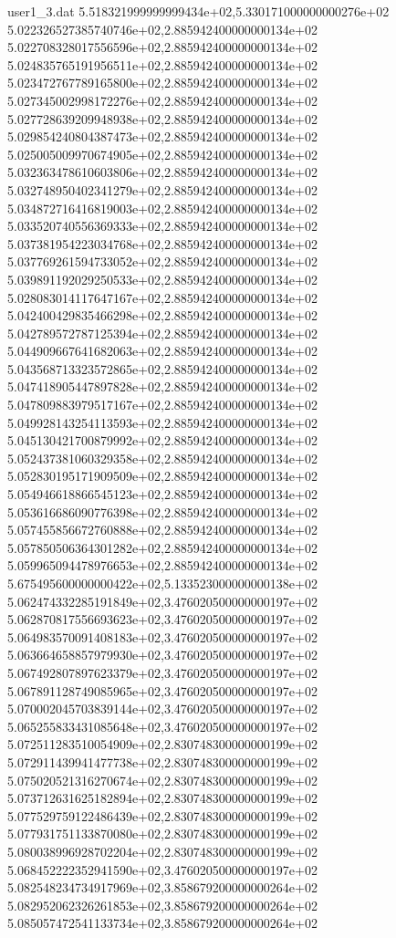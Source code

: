 \begin{filecontents}{user1_3.dat}
5.518321999999999434e+02,5.330171000000000276e+02
5.022326527385740746e+02,2.885942400000000134e+02
5.022708328017556596e+02,2.885942400000000134e+02
5.024835765191956511e+02,2.885942400000000134e+02
5.023472767789165800e+02,2.885942400000000134e+02
5.027345002998172276e+02,2.885942400000000134e+02
5.027728639209948938e+02,2.885942400000000134e+02
5.029854240804387473e+02,2.885942400000000134e+02
5.025005009970674905e+02,2.885942400000000134e+02
5.032363478610603806e+02,2.885942400000000134e+02
5.032748950402341279e+02,2.885942400000000134e+02
5.034872716416819003e+02,2.885942400000000134e+02
5.033520740556369333e+02,2.885942400000000134e+02
5.037381954223034768e+02,2.885942400000000134e+02
5.037769261594733052e+02,2.885942400000000134e+02
5.039891192029250533e+02,2.885942400000000134e+02
5.028083014117647167e+02,2.885942400000000134e+02
5.042400429835466298e+02,2.885942400000000134e+02
5.042789572787125394e+02,2.885942400000000134e+02
5.044909667641682063e+02,2.885942400000000134e+02
5.043568713323572865e+02,2.885942400000000134e+02
5.047418905447897828e+02,2.885942400000000134e+02
5.047809883979517167e+02,2.885942400000000134e+02
5.049928143254113593e+02,2.885942400000000134e+02
5.045130421700879992e+02,2.885942400000000134e+02
5.052437381060329358e+02,2.885942400000000134e+02
5.052830195171909509e+02,2.885942400000000134e+02
5.054946618866545123e+02,2.885942400000000134e+02
5.053616686090776398e+02,2.885942400000000134e+02
5.057455856672760888e+02,2.885942400000000134e+02
5.057850506364301282e+02,2.885942400000000134e+02
5.059965094478976653e+02,2.885942400000000134e+02
5.675495600000000422e+02,5.133523000000000138e+02
5.062474332285191849e+02,3.476020500000000197e+02
5.062870817556693623e+02,3.476020500000000197e+02
5.064983570091408183e+02,3.476020500000000197e+02
5.063664658857979930e+02,3.476020500000000197e+02
5.067492807897623379e+02,3.476020500000000197e+02
5.067891128749085965e+02,3.476020500000000197e+02
5.070002045703839144e+02,3.476020500000000197e+02
5.065255833431085648e+02,3.476020500000000197e+02
5.072511283510054909e+02,2.830748300000000199e+02
5.072911439941477738e+02,2.830748300000000199e+02
5.075020521316270674e+02,2.830748300000000199e+02
5.073712631625182894e+02,2.830748300000000199e+02
5.077529759122486439e+02,2.830748300000000199e+02
5.077931751133870080e+02,2.830748300000000199e+02
5.080038996928702204e+02,2.830748300000000199e+02
5.068452222352941590e+02,3.476020500000000197e+02
5.082548234734917969e+02,3.858679200000000264e+02
5.082952062326261853e+02,3.858679200000000264e+02
5.085057472541133734e+02,3.858679200000000264e+02

\end{filecontents}
